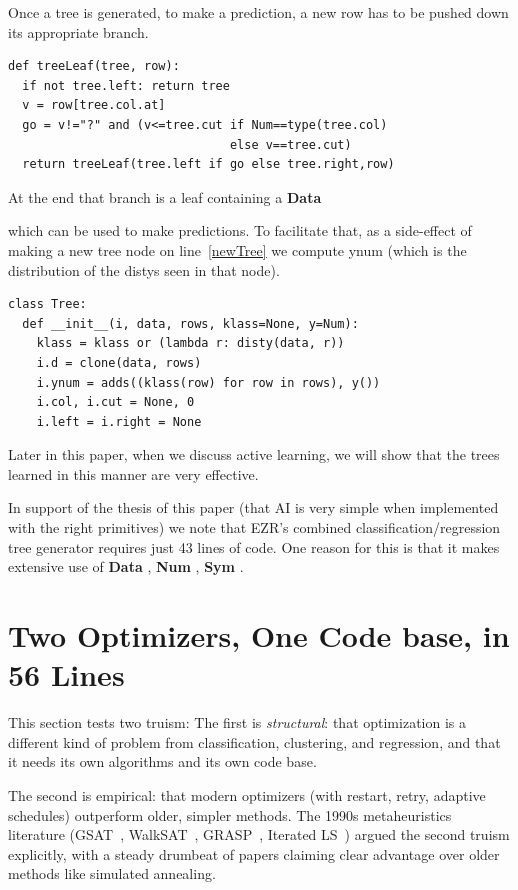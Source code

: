 \documentclass[AMA,STIX2COL]{WileyNJDv5}
\newcommand{\cls}[1]{%
  \setlength{\fboxsep}{1.5pt}%
  \colorbox{clsbg}{\sffamily\bfseries{#1}}%
}
\begin{document}
 Once a tree is generated,
 to make a prediction, a new row has to be pushed down its appropriate
branch. 
\begin{verbatim}
def treeLeaf(tree, row): 
  if not tree.left: return tree
  v = row[tree.col.at]
  go = v!="?" and (v<=tree.cut if Num==type(tree.col) 
                               else v==tree.cut)
  return treeLeaf(tree.left if go else tree.right,row)
\end{verbatim}
At the end that branch is a leaf containing a \cls{Data}
which can be used to make predictions.
To facilitate that, as a side-effect of making a new tree node on line~\ref{newTree}
we compute \textsf{ynum} (which is the distribution of 
the \textsf{disty}s seen in that node).
\begin{verbatim}
class Tree:
  def __init__(i, data, rows, klass=None, y=Num):
    klass = klass or (lambda r: disty(data, r))
    i.d = clone(data, rows)
    i.ynum = adds((klass(row) for row in rows), y())
    i.col, i.cut = None, 0
    i.left = i.right = None
\end{verbatim}
 Later in this paper, when we discuss active learning, we will show
 that the trees learned in this manner are very effective.
 
  In support of the thesis of this paper
  (that AI is very simple
  when implemented with the right primitives) we note that EZR's
  combined classification/regression tree  generator
  requires just 43 lines of code.
One reason for this is that it makes extensive use of 
\cls{Data}, \cls{Num}, \cls{Sym}.
  
\section{Two Optimizers, One Code base, in 56 Lines}\label{sec:opt}

This section tests two truism:
The first is {\em structural}: that
optimization is a different kind of problem from classification,
clustering, and regression, and that it needs its own algorithms
and its own code base. 

The second is {empirical}: that modern
optimizers (with restart, retry, adaptive schedules) outperform
older, simpler methods. The 1990s metaheuristics literature
(GSAT~\cite{gsat}, WalkSAT~\cite{walksat}, GRASP~\cite{grasp},
Iterated LS~\cite{ils}) argued the second truism explicitly, with
a steady drumbeat of papers claiming clear advantage over older
methods like simulated annealing. 
\end{document}
